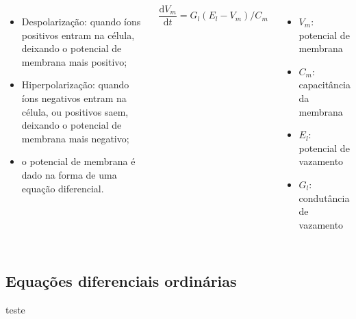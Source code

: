 \begin{frame}
	\begin{columns}[t]
		\column{5cm}
			\begin{itemize}
				\item Despolarização: quando íons positivos entram na célula, deixando o potencial de membrana mais positivo;
				\item Hiperpolarização: quando íons negativos entram na célula, ou positivos saem, deixando o potencial de membrana mais negativo;
				\item o potencial de membrana é dado na forma de uma equação diferencial.
			\end{itemize}
		\column{5cm}
			\[
				\frac{\mathrm{d}V_m}{\mathrm{d}t}=G_l(E_l-V_m)/C_m
			\]
			\begin{itemize}
				\item $V_m$: potencial de membrana
				\item $C_m$: capacitância da membrana
				\item $E_l$: potencial de vazamento
				\item $G_l$: condutância de vazamento
			\end{itemize}
	\end{columns}
\end{frame}

\subsection*{Equações diferenciais ordinárias}
\begin{frame}
	teste
\end{frame}
